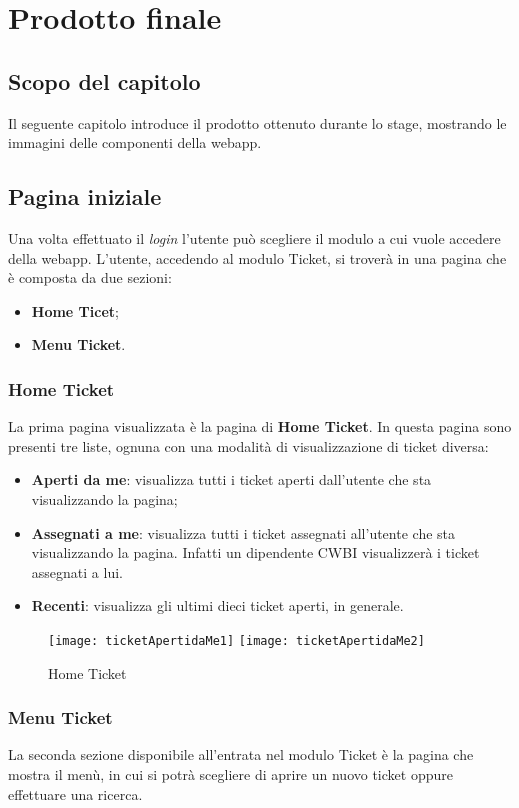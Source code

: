 \chapter{Prodotto finale}
\label{cap:prodotto finale}

\section{Scopo del capitolo}
Il seguente capitolo introduce il prodotto ottenuto durante lo stage, mostrando  le immagini delle componenti della webapp.

\section{Pagina iniziale}
Una volta effettuato il \textit{login} l'utente può scegliere il modulo a cui vuole accedere della webapp. L'utente, accedendo al modulo Ticket, si troverà in una pagina che è composta da due sezioni:
\begin{itemize}
\item \textbf{Home Ticet};
\item \textbf{Menu Ticket}.
\end{itemize}

\subsection{Home Ticket}
La prima pagina visualizzata è la pagina di \textbf{Home Ticket}. In questa pagina sono presenti tre liste, ognuna con una modalità di visualizzazione di ticket diversa:
\begin{itemize}
\item \textbf{Aperti da me}: visualizza tutti i ticket aperti dall'utente che sta visualizzando la pagina;
\item \textbf{Assegnati a me}: visualizza tutti i ticket assegnati all'utente che sta visualizzando la pagina. Infatti un dipendente CWBI visualizzerà i ticket assegnati a lui.
\item \textbf{Recenti}: visualizza gli ultimi dieci ticket aperti, in generale.
\end{itemize}

\begin{figure}[H]
	\centering
    \texttt{[image: ticketApertidaMe1]} 
    \texttt{[image: ticketApertidaMe2]} 
    \caption{Home Ticket}
\end{figure}

\subsection{Menu Ticket}
La seconda sezione disponibile all'entrata nel modulo Ticket è la pagina che mostra il menù, in cui si potrà scegliere di aprire un nuovo ticket oppure effettuare una ricerca.
 
